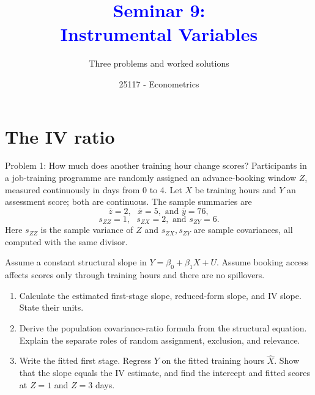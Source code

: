 \documentclass[notes,10pt, aspectratio=169]{beamer}
\title[]{\textcolor{blue}{Seminar 9:\\Instrumental Variables}}
\subtitle{Three problems and worked solutions}
\author{25117 - Econometrics}
\institute[shortinst]{Universitat Pompeu Fabra}
\date{}
\begin{document}
\begin{frame}[plain]
\maketitle
\end{frame}

\section{The IV ratio}
\begin{frame}{Problem 1: How much does another training hour change scores?}
\small
Participants in a job-training programme are randomly assigned an advance-booking window $Z$, measured continuously in days from 0 to 4. Let $X$ be training hours and $Y$ an assessment score; both are continuous. The sample summaries are
\[
\overline z=2,\text{ }\overline x=5,\text{ and }\overline y=76,
\]
\[
s_{ZZ}=1,\text{ }s_{ZX}=2,\text{ and }s_{ZY}=6.
\]
Here $s_{ZZ}$ is the sample variance of $Z$ and $s_{ZX},s_{ZY}$ are sample covariances, all computed with the same divisor.
\par\smallskip
Assume a constant structural slope in $Y=\beta_0+\beta_1X+U$. Assume booking access affects scores only through training hours and there are no spillovers.
\begin{enumerate}
\setlength{\itemsep}{5pt}
\item Calculate the estimated first-stage slope, reduced-form slope, and IV slope. State their units.
\item Derive the population covariance-ratio formula from the structural equation. Explain the separate roles of random assignment, exclusion, and relevance.
\item Write the fitted first stage. Regress $Y$ on the fitted training hours $\widehat X$. Show that the slope equals the IV estimate, and find the intercept and fitted scores at $Z=1$ and $Z=3$ days.
\end{enumerate}
\end{frame}
\end{document}
